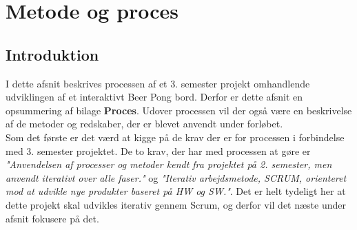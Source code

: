 \documentclass[Rapport/Rapport_main.tex]{subfiles}
\begin{document}
\section{Metode og proces}
\subsection{Introduktion}
I dette afsnit beskrives processen af et 3. semester projekt omhandlende udviklingen af et interaktivt Beer Pong bord. Derfor er dette afsnit en opsummering af bilage \textbf{Proces}. Udover processen vil der også være en beskrivelse af de metoder og redskaber, der er blevet anvendt under forløbet. \\
Som det første er det værd at kigge på de krav der er for processen i forbindelse med 3. semester projektet\cite{Universitet2018}. De to krav, der har med processen at gøre er \textit{"Anvendelsen af processer og metoder kendt fra projektet på 2. semester, men anvendt iterativt over alle faser."} og \textit{"Iterativ arbejdsmetode, SCRUM, orienteret mod at udvikle nye produkter baseret på HW og SW."}. Det er helt tydeligt her at dette projekt skal udvikles iterativ gennem Scrum, og derfor vil det næste under afsnit fokusere på det.
\end{document}
